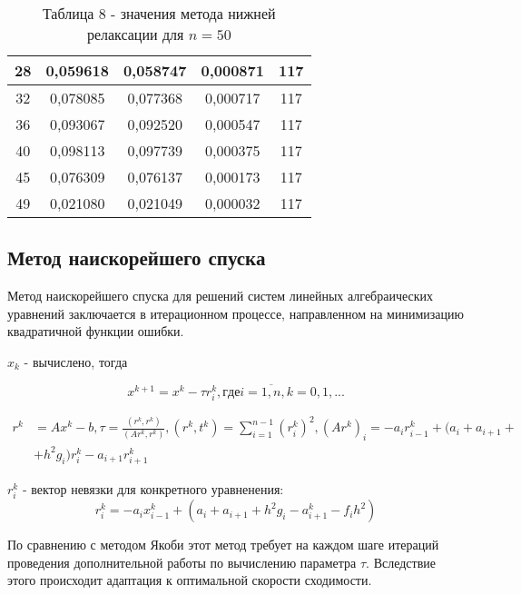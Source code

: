 \documentclass[a4paper,12pt]{article}
\begin{document}
{\begin{table}[h]
\begin{tabular}{|c|c|c|c|c|}
	   28 & 0,059618 & 0,058747 & 0,000871 & 117 \\ \hline
	   32 & 0,078085 & 0,077368 & 0,000717 & 117 \\ \hline
	   36 & 0,093067 & 0,092520 & 0,000547 & 117 \\ \hline
	   40 & 0,098113 & 0,097739 & 0,000375 & 117 \\ \hline
	   45 & 0,076309 & 0,076137 & 0,000173 & 117 \\ \hline
	   49 & 0,021080 & 0,021049 & 0,000032 & 117 \\ \hline
    \end{tabular}
    \caption*{\small{Таблица 8 - значения метода нижней релаксации для $n = 50$}}
\end{table}
\subsection{Метод наискорейшего спуска}
\hspace{1.25cm}Метод наискорейшего спуска для решений систем линейных алгебраических уравнений заключается 
в итерационном процессе, направленном на минимизацию квадратичной функции ошибки.

$x_k$ - вычислено, тогда

\begin{equation}
   x^{k+1} = x^k - \tau r_i^k, где i = \overline{1, n}, k = 0,1,...
    \label{11}
\end{equation}

\begin{align*}
    r^k &= Ax^k - b, \tau = \frac{(r^k, r^k)}{(Ar^k, r^k)}, (r^k, t^k) = \sum\limits_{i=1}^{n-1}(r_i^k)^2, (Ar^k)_i = -a_ir_{i-1}^k + (a_i + a_{i+1} + \\
    &+ h^2g_i)r_i^k - a_{i+1}r_{i+1}^k
\end{align*}
   
$r_i^k$ - вектор невязки для конкретного уравненения:
\begin{equation}
    r_i^k = -a_ix_{i-1}^k + (a_i + a_{i+1} + h^2g_i - a_{i+1}^k - f_ih^2)
     \label{12}
 \end{equation}

По сравнению с методом Якоби этот метод требует на каждом шаге 
итераций проведения дополнительной работы по вычислению параметра $\tau$. Вследствие
этого происходит адаптация к оптимальной скорости сходимости.

}
\end{document}
